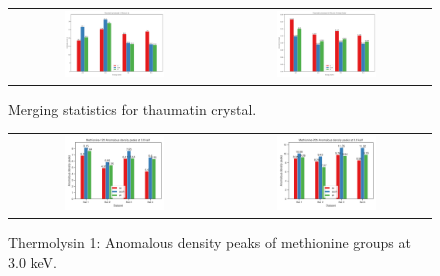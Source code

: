 \begin{figure}[h]
    \centering
    \begin{tabular}{cc}
    \includegraphics[width = 0.5\textwidth]{plots/exp0/thaum_Isig.png} & \includegraphics[width = 0.5\textwidth]{plots/exp0/thaum_rmerges.png}
    \end{tabular}
    \caption{Merging statistics for thaumatin crystal.}
    \label{fig:thaum1_stats}
\end{figure}


\newpage

\begin{figure}
    \centering
    \begin{tabular}{cc}
        \includegraphics[width = 0.5\textwidth]{plots/exp1/tlys_9_P6122/peaks/3p0_met120_peaks.png} & \includegraphics[width = 0.5\textwidth]{plots/exp1/tlys_9_P6122/peaks/3p0_met205_peaks.png}
    \end{tabular}
    \caption{Thermolysin 1: Anomalous density peaks of methionine groups at 3.0 \unit{keV}.}
    \label{fig:tlys9_met_peaks_3p0}
\end{figure}


